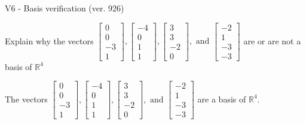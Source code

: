 \begin{exercise}
  \begin{exerciseTitle}V6 - Basis verification (ver. 926)\end{exerciseTitle}
  \begin{exerciseStatement}
    Explain why the vectors \(\left[\begin{array}{r}
0 \\
0 \\
-3 \\
1
\end{array}\right] , \left[\begin{array}{r}
-4 \\
0 \\
1 \\
1
\end{array}\right] , \left[\begin{array}{r}
3 \\
3 \\
-2 \\
0
\end{array}\right] , \text{ and } \left[\begin{array}{r}
-2 \\
1 \\
-3 \\
-3
\end{array}\right]\) are or are not a basis of \(\mathbb{R}^4\)	


  \end{exerciseStatement}
  \begin{exerciseAnswer}
   The vectors \(\left[\begin{array}{r}
0 \\
0 \\
-3 \\
1
\end{array}\right] , \left[\begin{array}{r}
-4 \\
0 \\
1 \\
1
\end{array}\right] , \left[\begin{array}{r}
3 \\
3 \\
-2 \\
0
\end{array}\right] , \text{ and } \left[\begin{array}{r}
-2 \\
1 \\
-3 \\
-3
\end{array}\right]\) 
  	 are  a basis of \(\mathbb{R}^4\).
  


  \end{exerciseAnswer}
\end{exercise}
